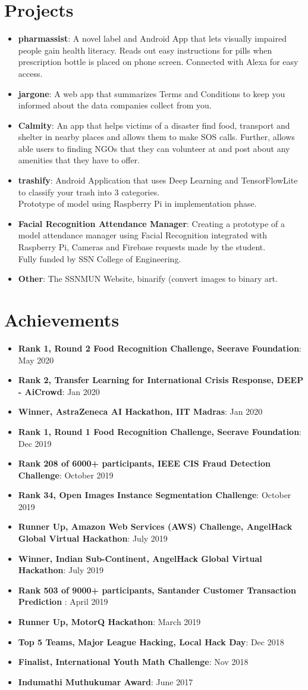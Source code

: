 \documentclass[letterpaper,11pt]{article}
\newcommand{\resumeItem}[2]{
  \item\small{
    \textbf{#1}{: #2 \vspace{-2pt}}
  }
}
\newcommand{\resumeSubItem}[2]{\resumeItem{#1}{#2}\vspace{-4pt}}
\newcommand{\resumeSubHeadingListStart}{\begin{itemize}[leftmargin=*]}
\newcommand{\resumeSubHeadingListEnd}{\end{itemize}}
\begin{document}
\section{Projects}
 \resumeSubHeadingListStart
  	\resumeSubItem{pharmassist}
      {A novel label and Android App that lets visually impaired people gain health literacy. Reads out easy instructions for pills when prescription bottle is placed on phone screen. Connected with Alexa for easy access.}
  \resumeSubItem{jargone}
      {A web app that summarizes Terms and Conditions to keep you informed about the data companies collect from you.}
    \resumeSubItem{Calmity}
      {An app that helps victims of a disaster find food, transport and shelter in nearby places and allows them to make SOS calls. Further, allows able users to finding NGOs that they can volunteer at and post about any amenities that they have to offer.}
      \resumeSubItem{trashify}
      {Android Application that uses Deep Learning and TensorFlowLite to classify your trash into 3 categories.\\Prototype of model using Raspberry Pi in implementation phase.}

    \resumeSubItem{Facial Recognition Attendance Manager}
      {Creating a prototype of a model attendance manager using Facial Recognition integrated with Raspberry Pi, Cameras and Firebase requests made by the student. \\Fully funded by SSN College of Engineering.}
      \resumeSubItem{Other}
      {The SSNMUN Website, binarify (convert images to binary art.}
  \resumeSubHeadingListEnd

\section{Achievements}
  \resumeSubHeadingListStart
  \resumeSubItem
  {Rank 1, Round 2 Food Recognition Challenge, Seerave Foundation}{May 2020}
                 \resumeSubItem
  {Rank 2, Transfer Learning for International Crisis Response, DEEP - AiCrowd}{Jan 2020}
               \resumeSubItem
  {Winner, AstraZeneca AI Hackathon, IIT Madras}{Jan 2020}
             \resumeSubItem
  {Rank 1, Round 1 Food Recognition Challenge, Seerave Foundation}{Dec 2019}
           \resumeSubItem
  {Rank 208 of 6000+ participants, IEEE CIS Fraud Detection Challenge}{October 2019}
         \resumeSubItem
  {Rank 34, Open Images Instance Segmentation Challenge}{October 2019}
       \resumeSubItem
  {Runner Up, Amazon Web Services (AWS) Challenge, AngelHack Global Virtual Hackathon}{July 2019}
     \resumeSubItem
  {Winner, Indian Sub-Continent, AngelHack Global Virtual Hackathon}{July 2019}
  \resumeSubItem
  {Rank 503 of 9000+ participants, Santander Customer Transaction Prediction }{April 2019}
    \resumeSubItem
  {Runner Up, MotorQ Hackathon}{March 2019}
     \resumeSubItem
      {Top 5 Teams, Major League Hacking, Local Hack Day}{Dec 2018}
  \resumeSubItem
    {Finalist, International Youth Math Challenge}{Nov 2018}
    \resumeSubItem
      {Indumathi Muthukumar Award}{June 2017}
  \resumeSubHeadingListEnd
\end{document}
